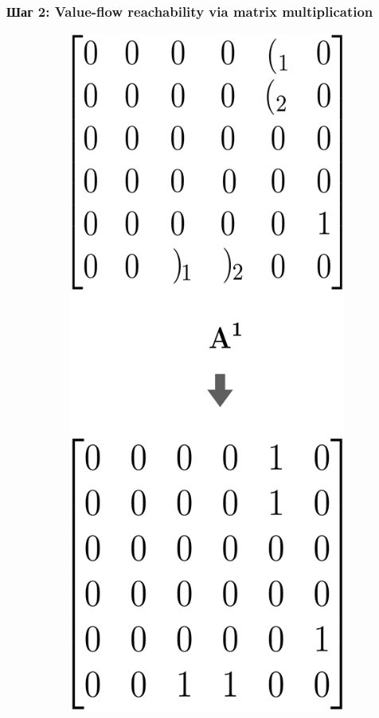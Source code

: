 \documentclass[xcolor=table,english]{beamer}
\begin{document}
\begin{frame}[fragile] \frametitle{Шаг 2: Value-flow reachability via matrix multiplication}
    \begin{figure}
        \centering
        \begin{subfigure}[b]{0.2\textwidth}
            \includegraphics[width=\textwidth]{figures/cfpq_1.png}

\end{subfigure}
\end{figure}
\end{frame}
\end{document}
